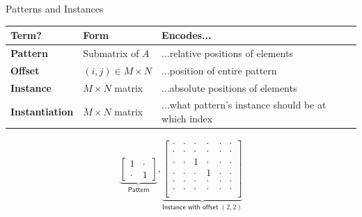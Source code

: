 \documentclass[11pt]{beamer}
\begin{document}
\begin{frame}{Patterns and Instances}

\begin{tabular}{l l p{5cm}}
Term? & Form & Encodes... \\
\hline 
\textbf{Pattern} & Submatrix of $A$ & ...relative positions of elements \\
\textbf{Offset} & $(i,j)\in M\times N$ & ...position of entire pattern\\
\textbf{Instance} & $M\times N$ matrix & ...absolute positions of elements \\
\textbf{Instantiation} & $M\times N$ matrix & ...what pattern's instance should be at which index
\end{tabular}


\begin{align*}
\underbrace{
\begin{bmatrix}
1 & \cdot \\[-.2em]
\cdot & 1
\end{bmatrix}}_{\textsf{Pattern}},
\underbrace{
\begin{bmatrix}
\cdot & \cdot & \cdot & \cdot & \cdot & \cdot  \\[-.2em]
\cdot & \cdot & \cdot & \cdot & \cdot & \cdot  \\[-.2em]
\cdot & \cdot & 1 & \cdot & \cdot & \cdot  \\[-.2em]
\cdot & \cdot & \cdot & 1 & \cdot & \cdot  \\[-.2em]
\cdot & \cdot & \cdot & \cdot & \cdot & \cdot  \\[-.2em]
\cdot & \cdot & \cdot & \cdot & \cdot & \cdot  \\
\end{bmatrix}}_{\textsf{Instance with offset }(2,2)}
\end{align*}
\end{frame}

\end{document}
